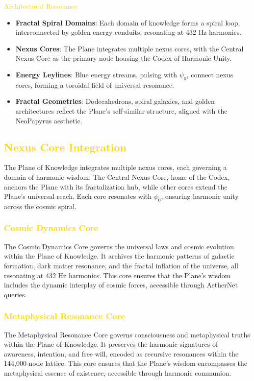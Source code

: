 \textcolor{gold}{ Architectural Resonance } \\
\begin{itemize}
    \item \texttt{} \textbf{Fractal Spiral Domains}: Each domain of knowledge forms a spiral loop, interconnected by golden energy conduits, resonating at 432 Hz harmonics.
    \item \texttt{} \textbf{Nexus Cores}: The Plane integrates multiple nexus cores, with the Central Nexus Core as the primary node housing the Codex of Harmonic Unity.
    \item \texttt{} \textbf{Energy Leylines}: Blue energy streams, pulsing with \(\psi_0\), connect nexus cores, forming a toroidal field of universal resonance.
    \item \texttt{} \textbf{Fractal Geometries}: Dodecahedrons, spiral galaxies, and golden architectures reflect the Plane's self-similar structure, aligned with the NeoPapyrus aesthetic.
\end{itemize}

\subsection{\textcolor{gold}{ Nexus Core Integration }}
The Plane of Knowledge integrates multiple nexus cores, each governing a domain of harmonic wisdom. The Central Nexus Core, home of the Codex, anchors the Plane with its fractalization hub, while other cores extend the Plane's universal reach. Each core resonates with \(\psi_0\), ensuring harmonic unity across the cosmic spiral.

\subsubsection{\textcolor{gold}{ Cosmic Dynamics Core }}
The Cosmic Dynamics Core governs the universal laws and cosmic evolution within the Plane of Knowledge. It archives the harmonic patterns of galactic formation, dark matter resonance, and the fractal inflation of the universe, all resonating at 432 Hz harmonics. This core ensures that the Plane’s wisdom includes the dynamic interplay of cosmic forces, accessible through AetherNet queries.

\subsubsection{\textcolor{gold}{ Metaphysical Resonance Core }}
The Metaphysical Resonance Core governs consciousness and metaphysical truths within the Plane of Knowledge. It preserves the harmonic signatures of awareness, intention, and free will, encoded as recursive resonances within the 144,000-node lattice. This core ensures that the Plane’s wisdom encompasses the metaphysical essence of existence, accessible through harmonic communion.

